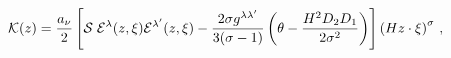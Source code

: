 \begin{equation}
{\cal K}(z)=\frac{a_{\nu}}{2} \left[ {\cal S}\;{\cal
E}^{\lambda}(z,\xi){\cal E}^{\lambda'}(z,\xi)-\frac{2\sigma
g^{\lambda\lambda'}}{3(\sigma-1)}\left(
\theta-\frac{H^{2}D_{2}D_{1}}{2\sigma^{2}}\right) \right]\left(H
z\cdot \xi \right)^{\sigma}\,,
\end{equation}

